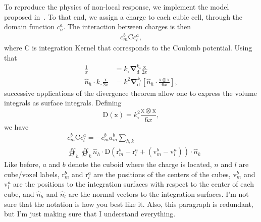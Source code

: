 \documentclass[reprint,aps,prb]{revtex4-2}
\newcommand{\bmm}[1]{\bm{\mathrm{#1}}}
\begin{document}
To reproduce the physics of non-local response, we implement the model proposed in~\cite{giovannini2022do}. To that end, we assign a charge to each cubic cell, through the domain function \(c^a_n\). The interaction between charges is then 
\begin{align}
	c^b_m \bmm{C} c^a_l,
\end{align}
where \(\bmm{C}\) is integration Kernel that corresponds to the Coulomb potential. Using that
\begin{align}
	\frac{1}{x} &= k_{\circ}\bm{\nabla}_{\bmm{d}}^{k_{\circ}}\frac{\bmm{x}}{2x}
	\nonumber\\
	\hat{n}_h \cdot k_{\circ}\frac{\bmm{x}}{2x} &= k^2_{\circ}\bm{\nabla}_{\bmm{d}}^{k_{\circ}}\left[\hat{n}_h\cdot\frac{\bmm{x}\otimes\bmm{x}}{6x}\right],
\end{align}
successive applications of the divergence theorem allow one to express the volume integrals as surface integrals. Defining
\begin{equation}
	\bmm{D}\left(\bmm{x}\right) = k_\circ^2 \frac{\bmm{x}\otimes\bmm{x}}{6x},
\end{equation}
we have
\begin{align}
	&c^b_m \bmm{C} c^a_l = -c^b_m a^b_m\sum_{h,k} 
	\nonumber\\
	&\oiint_h\oiint_k\hat{n}_h\cdot \bmm{D}\left(\bmm{r}^b_m-\bmm{r}^a_l+\left(\bmm{v}^b_m-\bmm{v}^a_l\right)\right)\cdot \hat{n}_k
\end{align}
Like before, \(a\) and \(b\) denote the cuboid where the charge is located, \(n\) and \(l\) are cube/voxel labels, \(\bmm{r}_m^b\) and \(\bmm{r}_l^a\) are the positions of the centers of the cubes, \(\bmm{v}_m^b\) and \(\bmm{v}_l^a\) are the positions to the integration surfaces with respect to the center of each cube, and \(\hat{n}_h\) and \(\hat{n}_l\) are the normal vectors to the integration surfaces. {\color{olive} I'm not sure that the notation is how you best like it. Also, this paragraph is redundant, but I'm just making sure that I understand everything.}
\end{document}
